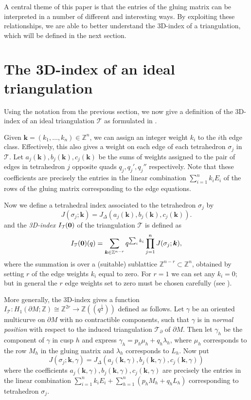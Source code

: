 \documentclass[12pt,reqno]{amsart}  %
\theoremstyle{definition}
\theoremstyle{remark}
\def\tri{\mathcal{T}}
\def\kk{\boldsymbol{k}}
\newcommand{\CT}{\mathcal{T}}
\def\be{  \begin{equation} }
\def\ee{  \end{equation} }
\def\Z{\mathbb Z}
\def\JD{J_{\Delta}}
\def\bd{\partial}
\begin{document}
A central theme of this paper is that the entries of the gluing matrix 
can be interpreted in a number of different and interesting ways. 
By exploiting these relationships, we are able to better understand the 
3D-index of a triangulation, which will be defined in the next section.


\section{The 3D-index of an ideal triangulation}

Using the notation from the previous section, we now give a definition of 
the 3D-index of an ideal triangulation $\tri$ as formulated 
in \cite[section 4.7]{GHRS}. 

Given $\kk =(k_1, \ldots, k_n)\in \Z^n$, we can assign an integer weight 
$k_i$ to the $i$th edge class. Effectively, this also gives a weight on 
each edge of each tetrahedron $\sigma_j$ in $\CT$.
Let $a_j(\kk), b_j(\kk), c_j(\kk)$ be the sums of weights assigned to 
the pair of edges in  tetrahedron $j$ opposite quads $q_j, q_j',q_j''$ 
respectively. Note that these coefficients are precisely the entries in 
the linear combination $\sum_{i=1}^n k_i E_i$ of the rows of the gluing matrix 
corresponding to the edge equations. 

Now we define a tetrahedral index associated to the tetrahedron $\sigma_j$ by
$$
J(\sigma_j;\kk)=\JD(a_j(\kk), b_j(\kk) , c_j(\kk)).
$$
and the \emph{3D-index}  $I_{\CT}({\bf 0})$ of the triangulation $\CT$ is 
defined as 
\be
I_{\CT}({\bf 0})(q)  = \sum_{\kk \in \Z^{n-r}} 
 q^{\sum_i k_i}   \prod_{j=1} ^n
J(\sigma_j;\kk),
\ee
where the summation is over a (suitable) sublattice  
$\Z^{n-r} \subset \Z^{n}$, obtained by setting $r$ of the edge weights 
$k_i$ equal to zero. For $r=1$ we can set any $k_i=0$; but  in general the 
$r$ edge weights set to zero must be chosen carefully (see 
\cite[sections 4.5, 4.6]{GHRS}).

More generally, the 3D-index gives a function 
$I_{\CT} : H_1(\bd M; \Z) \cong \Z^{2r}\to \Z((q^\frac{1}{2}))$ defined 
as follows. Let $\gamma$ be an oriented multicurve on $\bd M$ with no 
contractible components, such that $\gamma$  is in {\em normal position} 
with respect to the induced triangulation $\tri_\bd$ of $\bd M$. 
Then let $\gamma_h$ be the component of $\gamma$ in cusp $h$ and express 
$\gamma_h = p_h \mu_h + q_h \lambda_h$, where $\mu_h$ corresponds to the 
row $M_h$ in the gluing matrix and $\lambda_h$ corresponds to $L_h$.
Now put
$$
J(\sigma_j;\kk,\gamma)=\JD(a_j(\kk,\gamma), b_j(\kk,\gamma) , c_j(\kk,\gamma))
$$
where the coefficients  
$a_j(\kk,\gamma), b_j(\kk,\gamma), c_j(\kk,\gamma)$ are precisely the 
entries in the linear combination 
$\sum_{i =1}^nk_i E_i  +\sum_{h=1}^n (p_h M_h + q_h L_h)$ corresponding 
to tetrahedron $\sigma_j$.
\end{document}
